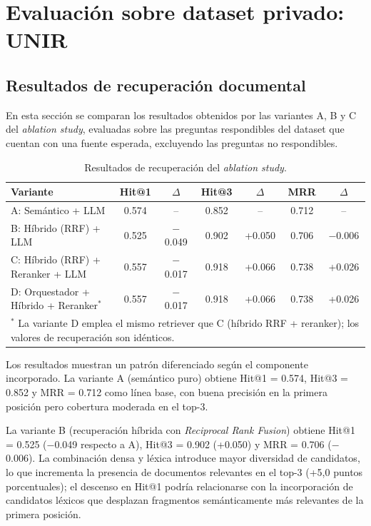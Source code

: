 \section{Evaluación sobre dataset privado: UNIR}\label{sec:resultados}

\subsection{Resultados de recuperación documental}\label{sec:resultados-recuperacion}

En esta sección se comparan los resultados obtenidos por las variantes A, B y C del \textit{ablation study}, evaluadas sobre las preguntas respondibles del dataset que cuentan con una fuente esperada, excluyendo las preguntas no respondibles.

\begin{table}[H]
\centering
\begin{tabular}{lcccccc}
\toprule
\textbf{Variante} & \textbf{Hit@1} & \textbf{$\Delta$} & \textbf{Hit@3} & \textbf{$\Delta$} & \textbf{MRR} & \textbf{$\Delta$} \\
\midrule
A: Semántico + LLM & 0.574 & -- & 0.852 & -- & 0.712 & -- \\
B: Híbrido (RRF) + LLM & 0.525 & $-$0.049 & 0.902 & +0.050 & 0.706 & $-$0.006 \\
C: Híbrido (RRF) + Reranker + LLM & 0.557 & $-$0.017 & 0.918 & +0.066 & 0.738 & +0.026 \\
D: Orquestador + Híbrido + Reranker$^*$ & 0.557 & $-$0.017 & 0.918 & +0.066 & 0.738 & +0.026 \\
\bottomrule
\multicolumn{7}{l}{\footnotesize $^*$ La variante D emplea el mismo retriever que C (híbrido RRF + reranker); los valores de recuperación son idénticos.}
\end{tabular}
\caption{Resultados de recuperación del \textit{ablation study}.}
\label{tab:resultados-recuperacion}
\end{table}

Los resultados muestran un patrón diferenciado según el componente incorporado. 
La variante A (semántico puro) obtiene Hit@1 = 0.574, Hit@3 = 0.852 y MRR = 0.712 como línea base, con buena precisión en la primera posición pero cobertura moderada en el top-3.

La variante B (recuperación híbrida con \textit{Reciprocal Rank Fusion}) obtiene Hit@1 = 0.525 ($-$0.049 respecto a A), Hit@3 = 0.902 (+0.050) y MRR = 0.706 ($-$0.006). 
La combinación densa y léxica introduce mayor diversidad de candidatos, lo que incrementa la presencia de documentos relevantes en el top-3 (+5,0 puntos porcentuales); el descenso en Hit@1 podría relacionarse con la incorporación de candidatos léxicos que desplazan fragmentos semánticamente más relevantes de la primera posición.

